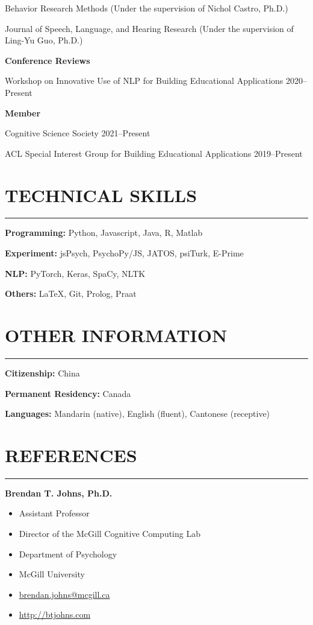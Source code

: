 \documentclass[11pt]{article}
\newcommand{\cvsection}[1]{\vspace{-0.2cm}\section*{\Large #1}\vspace{-0.2cm}\hrule\vspace{0.2cm}}
\newcommand{\h}[1]{\hspace{15pt} #1}
\begin{document}
\h{Behavior Research Methods (Under the supervision of Nichol Castro, Ph.D.)}

\h{Journal of Speech, Language, and Hearing Research (Under the supervision of Ling-Yu Guo, Ph.D.)}

\textbf{Conference Reviews}

\h{Workshop on Innovative Use of NLP for Building Educational Applications \hfill 2020--Present}

\textbf{Member}

\h{Cognitive Science Society \hfill 2021--Present}

\h{ACL Special Interest Group for Building Educational Applications \hfill 2019--Present}



\cvsection{TECHNICAL SKILLS}

\textbf{Programming:} Python, Javascript, Java, R, Matlab

\textbf{Experiment:} jsPsych, PsychoPy/JS, JATOS, psiTurk, E-Prime

\textbf{NLP:} PyTorch, Keras, SpaCy, NLTK

\textbf{Others:} \LaTeX, Git, Prolog, Praat


\cvsection{OTHER INFORMATION}

\textbf{Citizenship:} China

\textbf{Permanent Residency:} Canada

\textbf{Languages:} Mandarin (native), English (fluent), Cantonese (receptive)


\newpage

\cvsection{REFERENCES}

\textbf{Brendan T. Johns, Ph.D.}

\begin{itemize}[leftmargin=!,labelindent=!]
    \item[] Assistant Professor
    \item[] Director of the McGill Cognitive Computing Lab
    \item[] Department of Psychology
    \item[] McGill University
    \item[] \href{mailto:brendan.johns@mcgill.ca}{brendan.johns@mcgill.ca}
    \item[] \url{http://btjohns.com}
\end{itemize}

\vspace{0.2cm}
\end{document}
